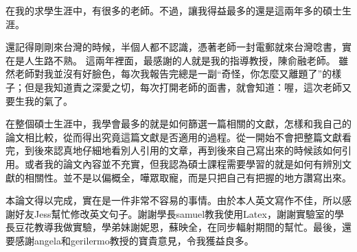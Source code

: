\begin{acknowledgements} 

在我的求學生涯中，有很多的老師。不過，讓我得益最多的還是這兩年多的碩士生涯。

還記得剛剛來台灣的時候，半個人都不認識，憑著老師一封電郵就來台灣唸書，實在是人生路不熟。 這兩年裡面，最感謝的人就是我的指導教授，陳俞融老師。 雖然老師對我並沒有好臉色，每次我報告完總是一副“奇怪，你怎麼又離題了”的樣子；但是我知道責之深愛之切，每次打開老師的面書，就會知道：喔，這次老師又要生我的氣了。

在整個碩士生涯中，我學會最多的就是如何篩選一篇相關的文獻，怎樣和我自己的論文相比較，從而得出究竟這篇文獻是否適用的過程。從一開始不會把整篇文獻看完，到後來認真地仔細地看別人引用的文章，再到後來自己寫出來的時候該如何引用。或者我的論文內容並不充實，但我認為碩士課程需要學習的就是如何有辨別文獻的相關性。並不是以偏概全，嘩眾取寵，而是只把自己有把握的地方讚寫出來。

本論文得以完成，實在是一件非常不容易的事情。由於本人英文寫作不佳，所以感謝好友Jess幫忙修改英文句子。謝謝學長samuel教我使用Latex，謝謝實驗室的學長豆花教導我做實驗，學弟妹謝妮恩，蘇映全，在同步輻射期間的幫忙。最後，還要感謝angela和gerilermo教授的寶貴意見，令我獲益良多。

\end{acknowledgements} 
